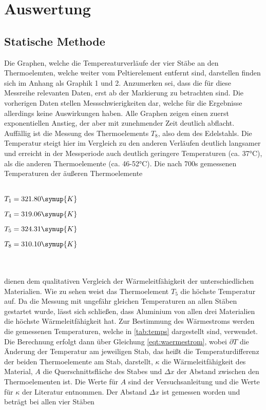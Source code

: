 \section{Auswertung}
\label{sec:Auswertung}
\subsection{Statische Methode}
Die Graphen, welche die Tempereaturverläufe der vier Stäbe an den Thermoelemten, welche weiter vom Peltierelement entfernt sind, darstellen finden
sich im Anhang als Graphik 1 und 2. Anzumerken sei, dass die für diese Messreihe relevanten Daten, erst ab der Markierung zu betrachten sind. Die vorherigen
Daten stellen Messschwierigkeiten dar, welche für die Ergebnisse allerdings keine Auswirkungen haben. Alle Graphen zeigen einen zuerst exponentiellen 
Anstieg, der aber mit zunehmender Zeit deutlich abflacht. Auffällig ist die Messung des Thermoelements $T_8$, also dem des Edelstahls. Die Temperatur 
steigt hier im Vergleich zu den anderen Verläufen deutlich langsamer und erreicht in der Messperiode auch deutlich geringere Temperaturen (ca. 37°C), als die 
anderen Thermoelemente (ca. 46-52°C). Die nach 700s gemessenen Temperaturen der äußeren Thermoelemente
\\ \\
\centerline{$T_1 = 321.80 \symup{K}$}
\centerline{$T_4 =  319.06 \symup{K}$}
\centerline{$T_5 =  324.31 \symup{K}$}
\centerline{$T_8 =  310.10 \symup{K}$}
\\ \\
dienen dem qualitativen Vergleich der Wärmeleitfähigkeit der unterschiedlichen Materialien.
Wie zu sehen weist das Thermoelement $T_5$ die höchste Temperatur auf. Da die Messung mit ungefähr gleichen Temperaturen an allen Stäben gestartet wurde,
lässt sich schließen, dass Aluminium von allen drei Materialien die höchste Wärmeleitfähigkeit hat. 
Zur Bestimmung des Wärmestroms werden die gemessenen Temperaturen, welche in \autoref{tab:temps} dargestellt sind, verwendet. 
Die Berechnung erfolgt dann über Gleichung \eqref{eqt:waermestrom}, wobei $\partial T$ die Änderung der Temperatur am jeweiligen Stab, das heißt 
die Temperaturdifferenz der beiden Thermoelemente am Stab, darstellt, $\kappa$ die Wärmeleitfähigkeit des Material, $A$ die Querschnittsfläche des Stabes und $\Delta x$ der Abstand zwischen den Thermoelementen ist.
Die Werte für $A$ sind der Versuchsanleitung \cite[2]{V204} und die Werte für $\kappa$ der Literatur \cite{unknown} entnommen. Der Abstand $\Delta x$ ist gemessen worden und beträgt bei allen vier Stäben
